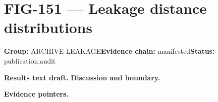 \clearpage
\section{FIG-151 --- Leakage distance distributions}
\label{figpage:fig-151}
\textbf{Group:} ARCHIVE-LEAKAGE\quad \textbf{Evidence chain:} manifested\quad \textbf{Status:} publication;audit

\textbf{Results text draft.} 
\textbf{Discussion and boundary.} 


\textbf{Evidence pointers.}



\vfill
